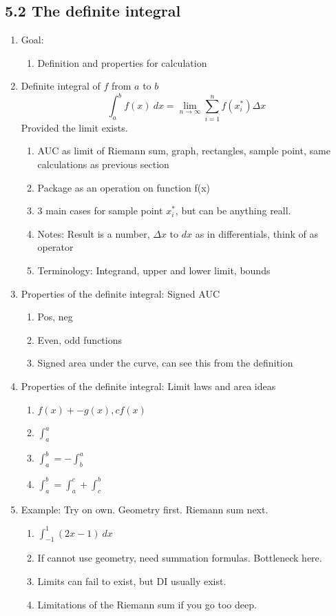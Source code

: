 \documentclass{article}
\begin{document}
\subsection{5.2 The definite integral}
\begin{enumerate}

\item Goal: 
\begin{enumerate}
\item Definition and properties for calculation
\end{enumerate}

\item  Definite integral of  $f$ from $a$ to $b$
$$
\int_a^b f(x)~dx = \lim_{n\rightarrow \infty} \sum_{i=1}^n f(x_i^*)\Delta x
$$
Provided  the limit exists.
\begin{enumerate}
\item AUC as limit of Riemann sum, graph, rectangles, sample point, same calculations as previous section
\item Package as an operation on function f(x)
\item 3 main cases for sample point $x_i^*$, but can be anything reall.
\item Notes: Result is a number, $\Delta x$ to $dx$ as in differentials, think of as operator
\item Terminology: Integrand, upper and lower limit, bounds
\end{enumerate}

\item Properties of the definite integral: Signed AUC
\begin{enumerate}
\item Pos, neg
\item Even, odd functions
\item Signed area under the curve, can see this from the definition
\end{enumerate}

\item Properties of the definite integral: Limit laws and area ideas
\begin{enumerate}
\item $f(x)+-g(x), cf(x)$
\item $\int_a^a$
\item $\int_a^b = - \int_b^a$
\item $\int_a^b = \int_a^c + \int_c^b$
\end{enumerate}


\item Example: Try on own. Geometry first. Riemann sum next.
\begin{enumerate}
\item $\int_{-1}^1 (2x-1)~dx$
\item If cannot use geometry, need summation formulas. Bottleneck here.
\item Limits can fail to exist, but DI usually exist.
\item Limitations of the Riemann sum if you go too deep.
\end{enumerate}
\end{enumerate}
\end{document}
